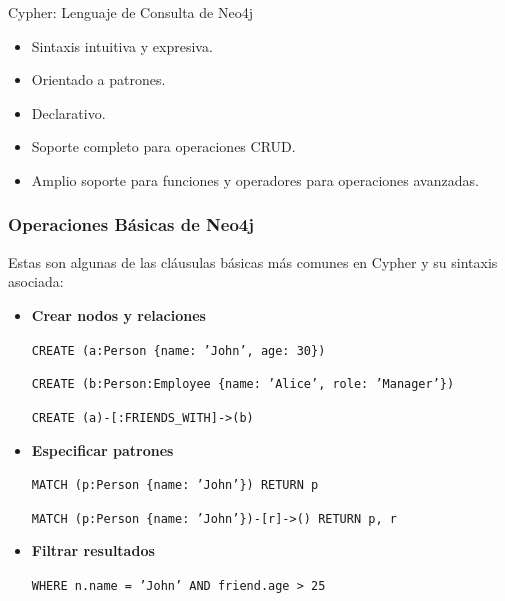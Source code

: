 \begin{frame}{Cypher: Lenguaje de Consulta de Neo4j}
    \begin{itemize}
        \item Sintaxis intuitiva y expresiva.  
        \item Orientado a patrones.  
        \item Declarativo.  
        \item Soporte completo para operaciones CRUD.  
        \item Amplio soporte para funciones y operadores para operaciones avanzadas.
    \end{itemize}
\end{frame}

\begin{frame}
    \frametitle{Operaciones Básicas de Neo4j}

    Estas son algunas de las cláusulas básicas más comunes en Cypher y su sintaxis asociada:

     

    \begin{itemize}
        \item \textbf{Crear nodos y relaciones}

        \texttt{CREATE (a:Person \{name: 'John', age: 30\})} \newline
         
        \texttt{CREATE (b:Person:Employee 
                            \{name: 'Alice', role: 'Manager'\})}\newline
         
        \texttt{CREATE (a)-[:FRIENDS\_WITH]->(b)}

         
            
        \item \textbf{Especificar patrones}
        
        \texttt{MATCH (p:Person \{name: 'John'\}) RETURN p}\newline
         
        \texttt{MATCH (p:Person \{name: 'John'\})-[r]->() RETURN p, r}

         
    
    
        \item \textbf{Filtrar resultados}

        \texttt{WHERE n.name = 'John' AND friend.age > 25}

 
    \end{itemize}
    
\end{frame}

